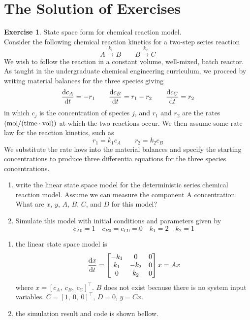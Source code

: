 \documentclass[11pt,a4paper]{report}
\theoremstyle{definition}\newtheorem{exercise}{Exercise}[chapter]
\begin{document}
\section{The Solution of Exercises}
\begin{exercise} State space form for chemical reaction model.\\
Consider the following chemical reaction kinetics for a two-step series reaction
\begin{equation}
    A\xrightarrow{k_1} B\qquad B\xrightarrow{k_2} C
\end{equation}
We wish to follow the reaction in a constant volume, well-mixed, batch reactor. As taught in the undergraduate chemical engineering curriculum, we proceed by writing material balances for the three species giving
\begin{equation}
    \dv{c_A}{t}=-r_1\qquad \dv{c_B}{t}=r_1-r_2\qquad \dv{c_C}{t}=r_2
\end{equation}
in which $c_j$ is the concentration of species $j$, and $r_1$ and $r_2$ are the rates $\rm (mol/(time\cdot vol))$ at which the two reactions occur. We then assume some rate law for the reaction kinetics, such as
\begin{equation}
    r_1=k_1 c_A\qquad r_2=k_2 c_B
\end{equation}
We substitute the rate laws into the material balances and specify the starting concentrations to produce three differentia equations for the three species concentrations. 

\begin{enumerate}[label=(\alph*)]
    \item write the linear state space model for the deterministic series chemical reaction model. Assume we can measure the component A concentration. What are $x$, $y$, $A$, $B$, $C$, and $D$ for this model?
    \item Simulate this model with initial conditions and parameters given by $$c_{A0}=1\quad c_{B0}=c_{C0}=0\quad k_1=2\quad k_2=1$$
\end{enumerate}
\end{exercise}

\begin{answer}
\begin{enumerate}[label=(\alph*)]
    \item the linear state space model is
    \begin{equation}
        \dv{x}{t} = 
        \begin{bmatrix}
            -k_1 &0 &0 \\
            k_1 &-k_2 &0 \\
            0 &k_2 &0 \\
        \end{bmatrix} x = A x
    \end{equation}
    where $x=[c_A,\ c_B,\ c_C]^\top$. $B$ does not exist because there is no system input variables. $C=[1,\ 0,\ 0]^\top$, $D=0$, $y=Cx$.
    \item the simulation result and code is shown bellow.
\end{enumerate}
\end{answer}
\end{document}
